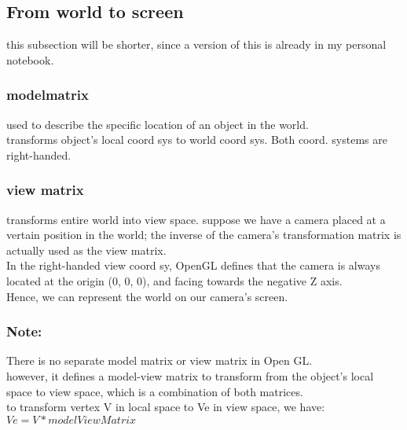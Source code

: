 \documentclass[a4paper,12pt]{book}
\begin{document}
\subsection{From world to screen}
this subsection will be shorter, since a version of this is already in my personal notebook.

\subsubsection{modelmatrix}
used to describe the specific location of an object in the world.\\
\textrightarrow transforms object's local coord sys to world coord sys. Both coord. systems are right-handed.\\

\subsubsection{view matrix}
\textrightarrow transforms entire world into view space.
suppose we have a camera placed at a vertain position in the world; the inverse of the camera's transformation matrix is actually used as the view matrix.\\
In the right-handed view coord sy, OpenGL defines that the camera is always located at the origin (0, 0, 0), and facing towards the negative Z axis.\\
\textrightarrow Hence, we can represent the world on our camera's screen.\\

\subsubsection{Note:}
There is no separate model matrix or view matrix in Open GL.\\
\textrightarrow however, it defines a model-view matrix to transform from the object's local space to view space, which is a combination of both matrices.\\
\textrightarrow to transform vertex V in local space to Ve in view space, we have:\\
$Ve = V * modelViewMatrix$
\end{document}
